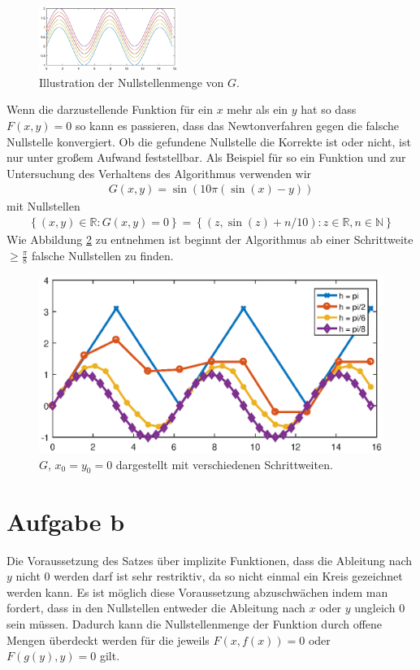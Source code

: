 \documentclass[a4paper,11pt,bibliography=totoc,listof=totoc,headinclude=true,cleardoublepage=empty,oneside]{scrartcl}
\begin{document}
\begin{figure}
	\centering
	\includegraphics[width=0.4\textwidth]{plots/A/vieleSinuse.eps}
	\caption{Illustration der Nullstellenmenge von $G$.}
	\label{fig:vieleSinuse_a}
\end{figure}
Wenn die darzustellende Funktion für ein $x$ mehr als ein $y$ hat so dass $F(x,y)=0$ so kann es passieren, dass das Newtonverfahren gegen die falsche Nullstelle konvergiert. Ob die gefundene Nullstelle die Korrekte ist oder nicht, ist nur unter großem Aufwand feststellbar. Als Beispiel für so ein Funktion und zur Untersuchung des Verhaltens des Algorithmus verwenden wir
\begin{align*}
G(x,y) = \sin(10\pi(\sin(x)-y))
\end{align*}
mit Nullstellen
\begin{align*}
\left\lbrace (x,y)\in\mathbb{R}: G(x,y)=0 \right\rbrace = \left\lbrace (z, \sin(z)+n/10): z \in \mathbb{R}, n \in \mathbb{N} \right\rbrace
\end{align*}
Wie Abbildung \ref{fig:vieleSinuse_schrittweiten_a} zu entnehmen ist beginnt der Algorithmus ab einer Schrittweite $\geq \frac{\pi}{8}$ falsche Nullstellen zu finden.
\begin{figure}[H]
\centering
\includegraphics[width=0.85\linewidth]{plots/A/vieleSinuse_Schrittweiten.eps}
\caption{$G$, $x_0 = y_0 = 0$ dargestellt mit verschiedenen Schrittweiten.}
\label{fig:vieleSinuse_schrittweiten_a}
\end{figure}


\section{Aufgabe b}
Die Voraussetzung des Satzes über implizite Funktionen, dass die Ableitung nach $y$ nicht $0$ werden darf ist sehr restriktiv, da so nicht einmal ein Kreis gezeichnet werden kann. Es ist möglich diese Voraussetzung abzuschwächen indem man fordert, dass in den Nullstellen entweder die Ableitung nach $x$ oder $y$ ungleich $0$ sein müssen. Dadurch kann die Nullstellenmenge der Funktion durch offene Mengen überdeckt werden für die jeweils $F(x,f(x))=0$ oder $F(g(y),y)=0$ gilt.
\end{document}

